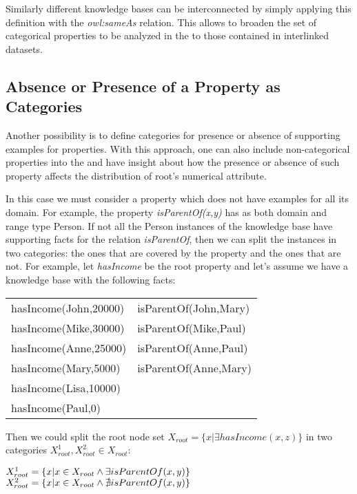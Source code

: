 Similarly different knowledge bases can be interconnected by simply applying this definition with the \emph{owl:sameAs}
relation. This allows to broaden the set of categorical properties to be analyzed in the \graphname to those contained
in interlinked datasets.

\subsection{Absence or Presence of a Property as Categories}

Another possibility is to define categories for presence or absence of supporting examples for properties. With this
approach, one can also
include non-categorical properties into the \graphname and have insight about how the presence or absence of such
property affects the distribution of root's numerical attribute.

In this case we must consider a property which does not have examples for all its domain. For example, the property
\emph{isParentOf(x,y)} has as both domain and range type Person. If not all the Person instances of the knowledge base
have supporting facts for the relation \emph{isParentOf}, then we can
split the instances in two categories: the ones that are covered by the property and the ones that are not. For example,
let \emph{hasIncome} be the root property and let's assume we have a knowledge base with the following facts:

\begin{tabular}{*{2}{l}}
  hasIncome(John,20000) & isParentOf(John,Mary) \\
  hasIncome(Mike,30000) & isParentOf(Mike,Paul) \\
  hasIncome(Anne,25000) & isParentOf(Anne,Paul) \\
  hasIncome(Mary,5000) 	& isParentOf(Anne,Mary) \\
  hasIncome(Lisa,10000) & 			\\
  hasIncome(Paul,0)	& 			\\
\end{tabular}

Then we could split the root node set $X_{root}=\{x|\exists hasIncome(x,z)\}$ in two categories $X_{root}^1,X_{root}^2
\in
X_{root}$:

$X_{root}^1=\{x| x \in X_{root} \land \exists isParentOf(x,y)\} \\$
$X_{root}^2=\{x| x \in X_{root} \land \nexists isParentOf(x,y)\} \\$

